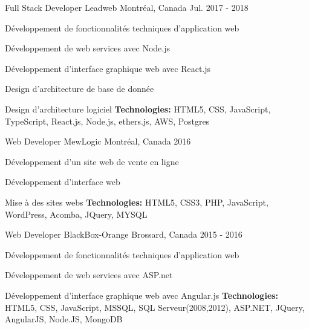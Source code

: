 \begin{cventries}
  \cventry
    {Full Stack Developer}
    {Leadweb}
    {Montréal, Canada}
    {Jul. 2017 - 2018}
    {
      \begin{cvitems}
        \item {Développement de fonctionnalités techniques d'application web}
        \item {Développement de web services avec Node.js}
        \item {Développement d'interface graphique web avec React.js}
        \item {Design d'architecture de base de donnée}
        \item {Design d'architecture logiciel}
        \newline
        \vspace{3mm}
        \textbf{Technologies: }{ HTML5, CSS, JavaScript, TypeScript, React.js, Node.js, ethers.js, AWS, Postgres }
      \end{cvitems}
    }

  \cventry
    {Web Developer}
    {MewLogic}
    {Montréal, Canada}
    {2016}
    {
      \begin{cvitems}
        \item {Développement d'un site web de vente en ligne}
        \item {Développement d’interface web}
        \item {Mise à des sites webs}
        \newline
        \vspace{3mm}
        \textbf{Technologies: }{ HTML5, CSS3, PHP, JavaScript,  WordPress, Acomba, JQuery, MYSQL }
      \end{cvitems}
    }
    \vspace{3mm}
    
  \cventry
    {Web Developer}
    {BlackBox-Orange}
    {Brossard, Canada}
    {2015 - 2016}
    {
      \begin{cvitems}
        \item {Développement de fonctionnalités techniques d'application web}
        \item {Développement de web services avec ASP.net}
        \item {Développement d'interface graphique web avec Angular.js}
        \newline
        \vspace{3mm}
        \textbf{Technologies: }{ HTML5, CSS, JavaScript, MSSQL, SQL Serveur(2008,2012), ASP.NET, JQuery, AngularJS, Node.JS, MongoDB}
      \end{cvitems}
    }
  

\end{cventries}

